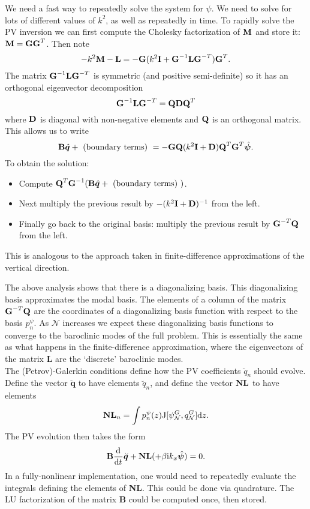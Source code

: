 \documentclass[10pt]{article}
\newcommand{\dd}[3]{\frac{\text{d}^{#3}#1}{\text{d}#2^{#3}}}
\newcommand{\tJ}{\text{J}}
\newcommand{\sN}{\mathcal{N}}
\newcommand{\mat}[1]{\text{\bf #1}}
\begin{document}
We need a fast way to repeatedly solve the system for $\psi$.
We need to solve for lots of different values of $k^2$, as well as repeatedly in time.
To rapidly solve the PV inversion we can first compute the Cholesky factorization of $\mat{M}$ and store it: $\mat{M} = \mat{GG}^T$.
Then note
\[-k^2\mat{M} -\mat{L} = -\mat{G}(k^2\mat{I}+\mat{G}^{-1}\mat{LG}^{-T})\mat{G}^T.\]
The matrix $\mat{G}^{-1}\mat{LG}^{-T}$ is symmetric (and positive semi-definite) so it has an orthogonal eigenvector decomposition
\[\mat{G}^{-1}\mat{LG}^{-T} = \mat{QD}\mat{Q}^{T}\]
where $\mat{D}$ is diagonal with non-negative elements and $\mat{Q}$ is an orthogonal matrix.
This allows us to write
\[\mat{B}\hat{\bm{q}} + \text{ (boundary terms) } = -\mat{GQ}(k^2\mat{I}+\mat{D})\mat{Q}^{T}\mat{G}^{T}\hat{\bm{\psi}}.\]
To obtain the solution:
\begin{itemize}
\item Compute $\mat{Q}^T\mat{G}^{-1}(\mat{B}\hat{\bm{q}} + \text{ (boundary terms) })$.
\item Next multiply the previous result by $-(k^2\mat{I}+\mat{D})^{-1}$ from the left. 
\item Finally go back to the original basis: multiply the previous result by $\mat{G}^{-T}\mat{Q}$ from the left. 
\end{itemize}
This is analogous to the approach taken in finite-difference approximations of the vertical direction.

The above analysis shows that there is a diagonalizing basis.
This diagonalizing basis approximates the modal basis.
The elements of a column of the matrix $\mat{G}^{-T}\mat{Q}$ are the coordinates of a diagonalizing basis function with respect to the basis $p_n^\psi$.
As $\sN$ increases we expect these diagonalizing basis functions to converge to the baroclinic modes of the full problem.
This is essentially the same as what happens in the finite-difference approximation, where the eigenvectors of the matrix {\bf L} are the `discrete' baroclinic modes.\\

The (Petrov)-Galerkin conditions  define how the PV coefficients $\breve{q}_n$ should evolve.
Define the vector $\breve{\bm{q}}$ to have elements $\breve{q}_n$, and define the vector $\mat{NL}$ to have elements 
\[\mat{NL}_n = \int p_n^\psi(z)\tJ[\psi_\sN^G,q_\sN^G]\text{d}z.\]
The PV evolution then takes the form
\[\mat{B}\dd{}{t}{}\breve{\bm{q}} + \mat{NL} (+\beta \text{i} k_x\hat{\bm{\psi}}) = 0.\]
In a fully-nonlinear implementation, one would need to repeatedly evaluate the integrals defining the elements of {\bf NL}.
This could be done via quadrature.
The LU factorization of the matrix {\bf B} could be computed once, then stored.\\
\end{document}
